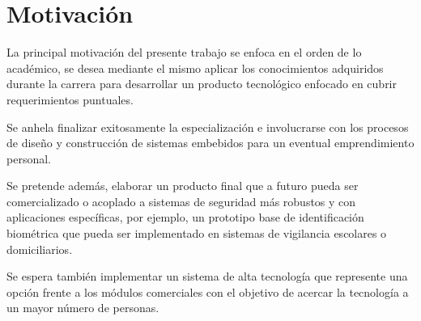 





\section{Motivación}

La principal motivación del presente trabajo se enfoca en el orden de lo académico, se desea mediante el mismo aplicar los conocimientos adquiridos durante la carrera para desarrollar un producto tecnológico enfocado en cubrir requerimientos puntuales.

Se anhela finalizar exitosamente la especialización e involucrarse con los procesos de diseño y construcción de sistemas embebidos para un eventual emprendimiento personal. 

Se pretende además, elaborar un producto final que a futuro pueda ser comercializado o acoplado a sistemas de seguridad más robustos y con aplicaciones específicas, por ejemplo, un prototipo base de identificación biométrica que pueda ser implementado en sistemas de vigilancia escolares o domiciliarios.

Se espera también implementar un sistema de alta tecnología que represente una opción frente a los módulos comerciales con el objetivo de acercar la tecnología a un mayor número de personas.






